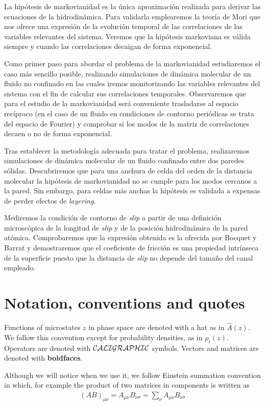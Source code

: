\documentclass[b5paper,openright,10pt]{book}
\begin{document}
La hipótesis de markovianidad es la única aproximación realizada para derivar las ecuaciones de la hidrodinámica. Para validarla emplearemos la teoría de Mori que nos ofrece una expresión de la evolución temporal de las correlaciones de las variables relevantes del sistema. Veremos que la hipótesis markoviana es válida siempre y cuando las correlaciones decaigan de forma exponencial.

Como primer paso para abordar el problema de la markovianidad estudiaremos el caso más sencillo posible, realizando simulaciones de dinámica molecular de un fluido no confinado en las cuales iremos monitorizando las variables relevantes del sistema con el fin de calcular sus correlaciones temporales. 
Observaremos que para el estudio de la markovianidad será conveniente trasladarse al espacio recíproco (en el caso de un fluido en condiciones de contorno periódicas se trata del espacio de Fourier) y comprobar si los modos de la matriz de correlaciones decaen o no de forma exponencial. 

Tras establecer la metodología adecuada para tratar el problema, realizaremos simulaciones de dinámica molecular de un fluido confinado entre dos paredes sólidas. Descubriremos que para una anchura de celda del orden de la distancia molecular la hipótesis de markovianidad no se cumple para los modos cercanos a la pared. Sin embargo, para celdas más anchas la hipótesis es validada a expensas de perder efectos de \textit{layering}. 

Mediremos la condición de contorno de \textit{slip} a partir de una definición microscópica de la longitud de \textit{slip} y de la posición hidrodinámica de la pared atómica. Comprobaremos que la expresión obtenida es la ofrecida por Bocquet y Barrat \cite{Bocquet1994} y demostraremos que el coeficiente de fricción es una propiedad intrínseca de la superficie puesto que la distancia de \textit{slip} no depende del tamaño del canal empleado. 


\chapter*{Notation, conventions and quotes}

Functions of microstates $z$ in phase space are denoted with a hat as in $\hat{A}(z)$. We follow this convention except for probability densities, as in $\rho_t(z)$. Operators are denoted with ${\cal CALIGRAPHIC}$ symbols. Vectors and matrices are denoted with {\bf boldfaces}.

Although we will notice when we use it, we follow Einstein summation convention in which, for example the product of two matrices in components is written as
\begin{align}
    (AB)_{\mu\nu} = A_{\mu\nu}B_{\nu\sigma}=\sum_{\nu}A_{\mu\nu}B_{\nu\sigma} \nonumber
\end{align}
\end{document}
